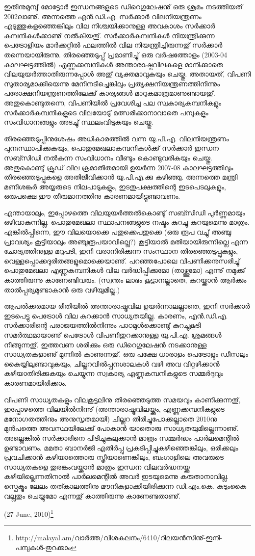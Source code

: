 ഇതിനുമുമ്പു് മോട്ടോര്‍ ഇന്ധനങ്ങളുടെ ഡിറെഗുലേഷനു് ഒരു ശ്രമം നടത്തിയത് 2002ലാണു്. അന്നത്തെ 
എന്‍.ഡി.എ. സര്‍ക്കാര്‍ വിലനിയന്ത്രണം എടുത്തുകളഞ്ഞെങ്കിലും വില നിശ്ചയിക്കാനുള്ള അവകാശം സര്‍ക്കാര്‍ 
കമ്പനികള്‍ക്കാണു് നല്‍കിയതു്. സര്‍ക്കാര്‍കമ്പനികള്‍ നിയന്ത്രിക്കുന്ന പെട്രോളിയം മാര്‍ക്കറ്റില്‍ ഫലത്തില്‍ വില 
നിയന്ത്രിച്ചിരുന്നതു് സര്‍ക്കാര്‍ തന്നെയായിരുന്നു. തിരഞ്ഞെടുപ്പു് പ്രമാണിച്ചു് ഒരു വര്‍ഷത്തോളം (2003-04 
കാലഘട്ടത്തില്‍) എണ്ണക്കമ്പനികള്‍ അന്താരാഷ്ട്രവിലകളെ മാനിക്കാതെ വിലയുയര്‍ത്താതിരുന്നപ്പോള്‍ 
അതു് വ്യക്തമാവുകയും ചെയ്തു. അതായത്, വിപണി സുതാര്യമാക്കിയെന്നു മേനിനടിച്ചെങ്കിലും പ്രത്യക്ഷനിയന്ത്രണത്തിനിന്നും പരോക്ഷനിയന്ത്രണത്തിലേക്കു് കാര്യങ്ങള്‍ മാറുകമാത്രമാണുണ്ടായതു്. അതുകൊണ്ടുതന്നെ, വിപണിയില്‍ 
പ്രവേശിച്ച പല സ്വകാര്യകമ്പനികളും സര്‍ക്കാര്‍കമ്പനികളുടെ വിലയോടു് മത്സരിക്കാനാവാതെ പമ്പുകളും 
സംവിധാനങ്ങളും അടച്ചു് സ്ഥലംവിടുകയും ചെയ്തു.

തിരഞ്ഞെടുപ്പിനുശേഷം അധികാരത്തില്‍ വന്ന യു.പി.എ. വിലനിയന്ത്രണം പുനഃസ്ഥാപിക്കുകയും, 
പൊതുമേഖലാകമ്പനികള്‍ക്ക് സര്‍ക്കാര്‍ ഇന്ധന സബ്സിഡി നല്‍കുന്ന സംവിധാനം വീണ്ടും കൊണ്ടുവരികയും 
ചെയ്തു. അതുകൊണ്ടു് ക്രൂഡ് വില ക്രമാതീതമായി ഉയര്‍ന്ന 2007-08 കാലഘട്ടത്തിലും തിരഞ്ഞെടുപ്പുകളെ 
അതിജീവിക്കാന്‍ യു.പി.എ.ക്കു കഴിഞ്ഞു. അന്നത്തെ മന്ത്രി മണിശങ്കര്‍ അയ്യരുടെ നിലപാടുകളും, ഇടതുപക്ഷത്തിന്റെ 
ഇടപെടലുകളും, ഒരുപക്ഷെ ഈ തീരുമാനത്തിനു കാരണമായിട്ടുണ്ടാവണം.

എന്തായാലും, ഇപ്പോഴത്തെ വിലയുയര്‍ത്തല്‍കൊണ്ടു് സബ്സിഡി പുര്‍ണ്ണമായും ഒഴിവാകുന്നില്ല. പൊതുമേഖലാ 
സ്ഥാപനങ്ങളുടെ നഷ്ടം കുറച്ചു കുറയുമെന്നു മാത്രം. എങ്കില്‍പ്പിന്നെ, ഈ വിലയൊക്കെ പതുക്കെപതുക്കെ (ഒരു രൂപ 
വച്ചു് അഞ്ചു പ്രാവശ്യം കൂട്ടിയാലും അഞ്ചുരൂപയാവില്ലെ?) കൂട്ടിയാല്‍ മതിയായിരുന്നില്ലെ എന്ന ചോദ്യത്തിനുള്ള മറുപടി, 
ഇനി വരാനിരിക്കുന്ന സംസ്ഥാന തിരഞ്ഞെടുപ്പുകളും, വെള്ളപ്പൊക്കദുരിതങ്ങളുമൊക്കെയാണു്. പറഞ്ഞപോലെ 
വിപണിക്കനുസരിച്ചു് പൊതുമേഖലാ എണ്ണകമ്പനികള്‍ വില വര്‍ദ്ധിപ്പിക്കുമോ (താഴ്ത്തുമോ) എന്നു് നമുക്കു് കാത്തിരുന്നു 
കാണേണ്ടിവരും. (സ്വന്തം ലാഭം കൂട്ടാനല്ലാതെ, കുറയ്ക്കാന്‍ ആര്‍ക്കും താല്‍പ്പര്യമുണ്ടാകാന്‍ ഒരു വഴിയുമില്ല.)

ആപല്‍ക്കരമായ രീതിയില്‍ അന്താരാഷ്ട്രവില ഉയര്‍ന്നാലല്ലാതെ, ഇനി സര്‍ക്കാര്‍ ഇടപെട്ടു പെട്രോള്‍ വില കുറക്കാന്‍
സാധ്യതയില്ല. കാരണം, എന്‍.ഡി.എ. സര്‍ക്കാരിന്റെ പരാജയത്തില്‍നിന്നും പാഠമുള്‍ക്കൊണ്ടു് കുറച്ചുകൂടി 
സമര്‍ത്ഥമായാണു് പെട്രോള്‍ വിപണിതുറക്കാനുള്ള യു.പി.എ. ശ്രമങ്ങള്‍ നീങ്ങുന്നതു്. ഇത്തവണ ശരിക്കും ഒരു 
ഡിറെഗുലേഷന്‍ നടക്കാനുള്ള സാധ്യതകളാണു് മുന്നില്‍ കാണുന്നതു്. ഒരു പക്ഷേ ധാരാളം പെട്രോളും ഡീസലും 
കൈയ്യിലുണ്ടാവുകയും, ചില്ലറവില്‍പ്പനശാലകള്‍ വഴി അവ വിറ്റഴിക്കാന്‍ കഴിയാതിരിക്കുകയും ചെയ്യുന്ന സ്വകാര്യ 
എണ്ണകമ്പനികളുടെ സമ്മര്‍ദ്ദവും കാരണമായിരിക്കാം.

വിപണി സാധ്യതകളും വിലകൂട്ടലിനു തിരഞ്ഞെടുത്ത സമയവും കാണിക്കുന്നതു്, ഇപ്പോഴത്തെ വിലയില്‍നിന്നു് 
(അന്താരാഷ്ട്രവിലയ്ക്കും, എണ്ണക്കമ്പനികളുടെ മനോഗതത്തിനും അനുസൃതമായി) ചില്ലറ തിരിച്ചുപോക്കല്ലാതെ 2010നു 
മുന്‍പത്തെ അവസ്ഥയിലേക്കു് പോകാന്‍ യാതൊരു സാധ്യതയുമില്ലെന്നാണു്. അല്ലെങ്കില്‍ സര്‍ക്കാരിനെ 
പിടിച്ചുകുലുക്കാന്‍ മാത്രം സമ്മര്‍ദ്ധം പാര്‍ലമെന്റില്‍ ഉണ്ടാവണം. മമതാ ബാനര്‍ജി എതിര്‍പ്പു പ്രകടിപ്പിച്ചുകഴിഞ്ഞെങ്കിലും,
ഒരിക്കലും പ്രവചിക്കാന്‍ കഴിയാത്തൊരു സ്ത്രീയാണെങ്കിലും, ബംഗാളിലെ അവരുടെ സാധ്യതകളെ തുരങ്കംവയ്ക്കാന്‍ മാത്രം
ഇന്ധന വിലവര്‍ദ്ധനയ്ക്കു കഴിയില്ലെന്നതിനാല്‍ പാര്‍ലമെന്റില്‍ അവര്‍ ഇടയുമെന്നു കരുതാനാവില്ല. സ്പെക്ട്രം ലേലം
തത്കാലത്തിനു മൗനികളാക്കിയിരിക്കുന്ന ഡി.എം.കെ. കടുംകൈ വല്ലതും ചെയ്യുമോ എന്നതു് കാത്തിരുന്നു 
കാണേണ്ടതാണു്.

\hspace*{2em}(27 June, 2010)\footnote{http://malayal.am/വാര്‍ത്ത/വിശകലനം/6410/റിലയന്‍സിനു്-ഇനി-പമ്പുകള്‍-തുറക്കാം}

\newpage
